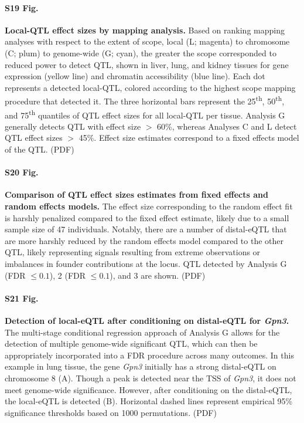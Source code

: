 \documentclass[10pt,letterpaper]{article}
\begin{document}
\paragraph*{S19 Fig.}
\label{S_qtl_effect_sizes_by_method}
{\bf Local-QTL effect sizes by mapping analysis.}
Based on ranking mapping analyses with respect to the extent of scope, local (L; magenta) to chromosome (C; plum) to genome-wide (G; cyan), the greater the scope corresponded to reduced power to detect QTL, shown in liver, lung, and kidney tissues for gene expression (yellow line) and chromatin accessibility (blue line). Each dot represents a detected local-QTL, colored according to the highest scope mapping procedure that detected it. The three horizontal bars represent the 25\textsuperscript{th}, 50\textsuperscript{th}, and 75\textsuperscript{th} quantiles of QTL effect sizes for all local-QTL per tissue. Analysis G generally detects QTL with effect size $>$ 60\%, whereas Analyses C and L detect QTL effect sizes $>$ 45\%. Effect size estimates correspond to a fixed effects model of the QTL. (PDF)

\paragraph*{S20 Fig.}
\label{S_qtl_effect_size_fixefvsranef}
{\bf Comparison of QTL effect sizes estimates from fixed effects and random effects models.}
The effect size corresponding to the random effect fit is harshly penalized compared to the fixed effect estimate, likely due to a small sample size of 47 individuals. Notably, there are a number of distal-eQTL that are more harshly reduced by the random effects model compared to the other QTL, likely representing signals resulting from extreme observations or imbalances in founder contributions at the locus. QTL detected by Analysis G (FDR $\le 0.1$), 2 (FDR $\le 0.1$), and 3 are shown. (PDF)

\paragraph*{S21 Fig.}
\label{S_conditional_scan}
{\bf Detection of local-eQTL after conditioning on distal-eQTL for \textit{Gpn3}.} 
The multi-stage conditional regression approach of Analysis G allows for the detection of multiple genome-wide significant QTL, which can then be appropriately incorporated into a FDR procedure across many outcomes. In this example in lung tissue, the gene \textit{Gpn3} initially has a strong distal-eQTL on chromosome 8 (A). Though a peak is detected near the TSS of \textit{Gpn3}, it does not meet genome-wide significance. However, after conditioning on the distal-eQTL, the local-eQTL is detected (B). Horizontal dashed lines represent empirical 95\% significance thresholds based on 1000 permutations. (PDF)
\end{document}
